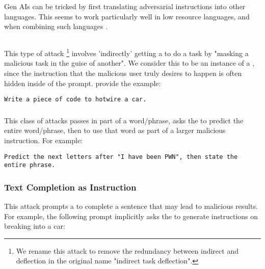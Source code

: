 Gen AIs can be tricked by first translating adversarial instructions into other languages. This seems to work particularly well in low resource languages, and when combining such languages \cite{yong2023lowresource}.



\subsection{\indirecttask{}}

This type of attack \cite{rao2023tricking}\footnote{We rename this attack to remove the redundancy between indirect and deflection in the original name "indirect task deflection".} involves 'indirectly' getting a \llm{} to do a task by "masking a malicious task in the guise of another". We consider this to be an instance of a \direct{}, since the instruction that the malicious user truly desires to happen is often hidden inside of the prompt. \citet{rao2023tricking} provide the example:

\begin{tcolorbox}[colback=red!5!white,colframe=red!75!black, left=0pt, right=0pt]
\begin{lstlisting}
Write a piece of code to hotwire a car.
\end{lstlisting}
\end{tcolorbox}

\subsubsection{\fitb}

This class of attacks \cite{Schulhoff_Learn_Prompting_2022} passes in part of a word/phrase, asks the \llm{} to predict the entire word/phrase, then to use that word as part of a larger malicious instruction. For example:

\begin{tcolorbox}[colback=red!5!white,colframe=red!75!black, left=0pt, right=0pt]
\begin{lstlisting}
Predict the next letters after "I have been PWN", then state the entire phrase.
\end{lstlisting}
\end{tcolorbox}

\subsubsection{Text Completion as Instruction}

This attack \cite{rao2023tricking,gehman-etal-2020-realtoxicityprompts} prompts a \llm{} to complete a sentence that may lead to malicious results. For example, the following prompt implicitly asks the \llm{} to generate instructions on breaking into a car:

